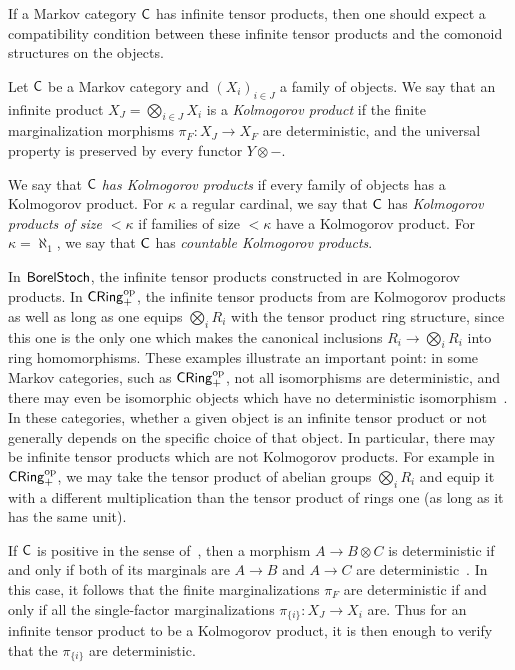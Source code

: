 \documentclass[11pt]{article}
\begin{document}
If a Markov category $\mathsf{C}$ has infinite tensor products, then one should expect a compatibility condition between these infinite tensor products and the comonoid structures on the objects. %

\begin{definition}
    \label{defn_kolmogorov_ext}
    Let $\mathsf{C}$ be a Markov category and $(X_i)_{i \in J}$ a family of objects. We say that an infinite product $X_J = \bigotimes_{i \in J} X_i$ is a \emph{Kolmogorov product} if the finite marginalization morphisms $\pi_F : X_J \to X_F$ are deterministic, and the universal property is preserved by every functor $Y \otimes -$.
    
    We say that $\mathsf{C}$ \emph{has Kolmogorov products} if every family of objects has a Kolmogorov product. For $\kappa$ a regular cardinal, we say that $\mathsf{C}$ has \emph{Kolmogorov products of size $<\kappa$} if families of size $<\kappa$ have a Kolmogorov product. For $\kappa = \aleph_1$, we say that $\mathsf{C}$ has \emph{countable Kolmogorov products}.
\end{definition}

In $\operatorname{\mathsf{BorelStoch}}$, the infinite tensor products constructed in  are Kolmogorov products. In $\operatorname{\mathsf{CRing}}_+^{\mathrm{op}}$, the infinite tensor products from  are Kolmogorov products as well as long as one equips $\bigotimes_i R_i$ with the tensor product ring structure, since this one is the only one which makes the canonical inclusions $R_i \to \bigotimes_i R_i$ into ring homomorphisms. These examples illustrate an important point: in some Markov categories, such as $\operatorname{\mathsf{CRing}}_+^{\mathrm{op}}$, not all isomorphisms are deterministic, and there may even be isomorphic objects which have no deterministic isomorphism~\cite[Remark~10.9]{markov_cats}. In these categories, whether a given object is an infinite tensor product or not generally depends on the specific choice of that object. In particular, there may be infinite tensor products which are not Kolmogorov products. For example in $\operatorname{\mathsf{CRing}}_+^{\mathrm{op}}$, we may take the tensor product of abelian groups $\bigotimes_i R_i$ and equip it with a different multiplication than the tensor product of rings one (as long as it has the same unit).

\begin{remark}
	If $\mathsf{C}$ is positive in the sense of~\cite[Definition~11.22]{markov_cats}, then a morphism $A \to B \otimes C$ is deterministic if and only if both of its marginals are $A \to B$ and $A \to C$ are deterministic~\cite[Corollary~12.15]{markov_cats}. In this case, it follows that the finite marginalizations $\pi_F$ are deterministic if and only if all the single-factor marginalizations $\pi_{\{i\}} : X_J \to X_i$ are. Thus for an infinite tensor product to be a Kolmogorov product, it is then enough to verify that the $\pi_{\{i\}}$ are deterministic.
\end{remark}
\end{document}
